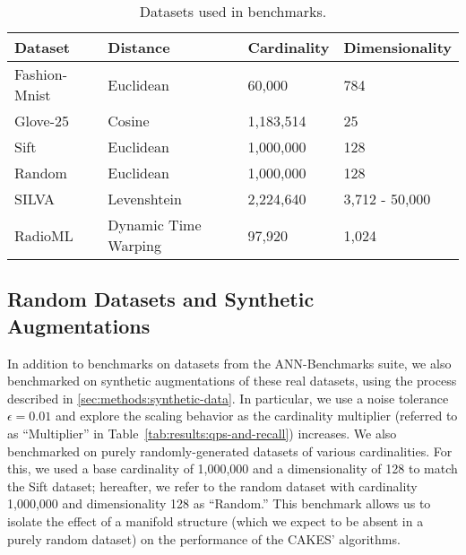 \begin{table}[!t]
    \caption{Datasets used in benchmarks.}
    \label{tab:datasets:summary}
    \vskip 0.15in
    \begin{center}
        \begin{small}
            \begin{sc}
                \begin{tabular}{|l|l|l|l|}
                    \hline
                    \textbf{Dataset} & \textbf{Distance}  &\textbf{Cardinality}  & \textbf{Dimensionality}  \\
                    \hline
                    Fashion-Mnist    & Euclidean              & 60,000             & 784                    \\
                    \hline
                    Glove-25         & Cosine                 & 1,183,514          & 25                     \\
                    \hline
                    Sift             & Euclidean              & 1,000,000          & 128                    \\
                    \hline
                    Random           & Euclidean              & 1,000,000          & 128                    \\
                    \hline
                    SILVA            & Levenshtein            & 2,224,640          & 3,712 - 50,000         \\
                    \hline
                    RadioML          & Dynamic Time Warping   & 97,920             & 1,024                  \\
                    \hline
                \end{tabular}
            \end{sc}
        \end{small}
    \end{center}
    \vskip -0.1in
\end{table}

\subsection{Random Datasets and Synthetic Augmentations}
\label{sec:datasets-and-benchmarks:random-datasets}

In addition to benchmarks on datasets from the ANN-Benchmarks suite, we also benchmarked on synthetic augmentations of these real datasets, using the process described in \ref{sec:methods:synthetic-data}.
In particular, we use a noise tolerance $\epsilon = 0.01$ and explore the scaling behavior as the cardinality multiplier (referred to as ``Multiplier'' in Table~\ref{tab:results:qps-and-recall}) increases.
We also benchmarked on purely randomly-generated datasets of various cardinalities.
For this, we used a base cardinality of 1,000,000 and a dimensionality of 128 to match the Sift dataset; hereafter, we refer to the random dataset with cardinality 1,000,000 and dimensionality 128 as ``Random.''
This benchmark allows us to isolate the effect of a manifold structure (which we expect to be absent in a purely random dataset) on the performance of the CAKES' algorithms.



